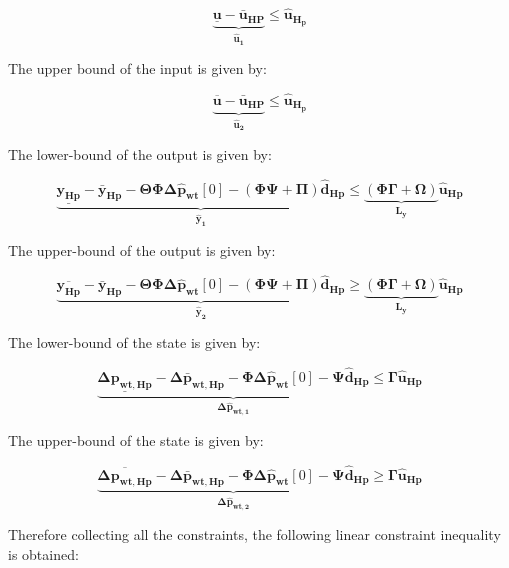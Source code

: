 \begin{equation}
\underbrace{\underline{\bm{u}} - \bm{\bar{u}_{HP}}}_{\bm{\hat{u}_{1}}} \leq \bm{\hat{u}_{H_p}}
\end{equation}

The upper bound of the input is given by:

\begin{equation}
	\underbrace{\overline{\bm{{u}}} - \bm{\bar{u}_{HP}}}_{\bm{\hat{u}_{2}}} \leq \bm{\hat{u}_{H_p}}
\end{equation}

The lower-bound of the output is given by:

\begin{equation}
\underbrace{\underline{\bm{y_{Hp}}} - \bm{\bar{y}_{Hp}} - \bm{\Theta} \bm{\Phi} \bm{\Delta \hat{p}_{wt}}[0] - (\bm{\Phi \Psi + \Pi}) \bm{\hat{d}_{Hp}}}_{\bm{\hat{y}_1}} \leq \underbrace{(\bm{\Phi \Gamma + \Omega})}_{\bm{L_y}} \bm{\hat{u}_{Hp}}
\end{equation}

The upper-bound of the output is given by:

\begin{equation}
\underbrace{\overline{\bm{y_{Hp}}} - \bm{\bar{y}_{Hp}} - \bm{\Theta} \bm{\Phi} \bm{\Delta \hat{p}_{wt}}[0] - (\bm{\Phi \Psi + \Pi}) \bm{\hat{d}_{Hp}}}_{\bm{\hat{y}_2}} \geq \underbrace{(\bm{\Phi \Gamma + \Omega})}_{\bm{L_y}} \bm{\hat{u}_{Hp}}
\end{equation}

The lower-bound of the state is given by:

\begin{equation}
\underbrace{\underline{\bm{\Delta p_{wt,Hp}}} - \bm{\Delta \bar{p}_{wt,Hp}} -  \bm{\Phi} \bm{\Delta \hat{p}_{wt}}[0] - \bm{\Psi} \bm{\hat{d}_{Hp}}}_{\bm{\Delta \hat{p}_{wt,1}}} \leq \bm{\Gamma} \bm{\hat{u}_{Hp}}
\end{equation}

The upper-bound of the state is given by:

\begin{equation}
\underbrace{\overline{\bm{\Delta p_{wt,Hp}}} - \bm{\Delta \bar{p}_{wt,Hp}} -  \bm{\Phi} \bm{\Delta \hat{p}_{wt}}[0] - \bm{\Psi} \bm{\hat{d}_{Hp}}}_{\bm{\Delta \hat{p}_{wt,2}}} \geq \bm{\Gamma} \bm{\hat{u}_{Hp}}
\end{equation}

Therefore collecting all the constraints, the following linear constraint inequality is obtained:

